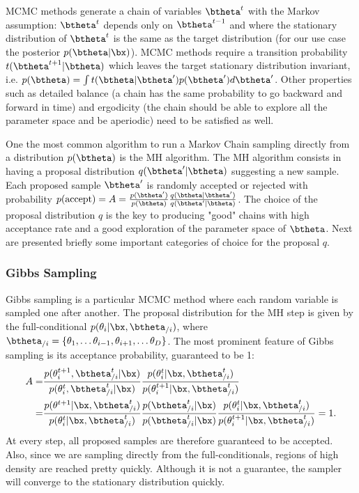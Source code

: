 \acf{MCMC} methods generate a chain of variables $\btheta^t$ with the Markov assumption: $\btheta^t$ depends only on $\btheta^{t-1}$ and where the stationary distribution of $\btheta^t$ is the same as the target distribution (for our use case the posterior $p(\btheta|\bx)$).
\ac{MCMC} methods require a transition probability $t(\btheta^{t+1}|\btheta)$ which leaves the target stationary distribution invariant, i.e. $p(\btheta) = \int t(\btheta|\btheta')p(\btheta')d\btheta'$.
Other properties such as detailed balance (a chain has the same probability to go backward and forward in time) and ergodicity (the chain should be able to explore all the parameter space and be aperiodic) need to be satisfied as well.

One the most common algorithm to run a Markov Chain sampling directly from a distribution $p(\btheta)$ is the \acf{MH} algorithm.
The \ac{MH} algorithm consists in having a proposal distribution $q(\btheta'|\btheta)$ suggesting a new sample.
Each proposed sample $\btheta'$ is randomly accepted or rejected with probability $p(\text{accept}) = A = \frac{p(\btheta')}{p(\btheta)}\frac{q(\btheta|\btheta')}{q(\btheta'|\btheta)}$.
The choice of the proposal distribution $q$ is the key to producing "good" chains with high acceptance rate and a good exploration of the parameter space of $\btheta$.
Next are presented briefly some important categories of choice for the proposal $q$.


\subsubsection{Gibbs Sampling}

Gibbs sampling is a particular \ac{MCMC} method where each random variable is sampled one after another.
The proposal distribution for the \ac{MH} step is given by the full-conditional  $p(\theta_i|\bx,\btheta_{/i})$, where $\btheta_{/i}=\{\theta_1, \ldots \theta_{i-1}, \theta_{i+1},\ldots \theta_{D}\}$.
The most prominent feature of Gibbs sampling is its acceptance probability, guaranteed to be 1:
\begin{align*}
    A =& \frac{p(\theta^{t+1}_i,\btheta^t_{/i}|\bx)}{p(\theta^t_i,\btheta^t_{/i}|\bx)}\frac{p(\theta^t_i|\bx,\btheta^{t}_{/i})}{p(\theta^{t+1}_i|\bx,\btheta^t_{/i})}\\
    =& \frac{p(\theta^{t+1}|\bx, \btheta^{t}_{/i})}{p(\theta^t_i|\bx,\btheta^t_{/i})}\frac{p(\btheta^t_{/i}|\bx)}{p(\btheta^t_{/i}|\bx)}\frac{p(\theta^t_i|\bx,\btheta^{t}_{/i})}{p(\theta^{t+1}_i|\bx,\btheta^t_{/i})} = 1.
\end{align*}
At every step, all proposed samples are therefore guaranteed to be accepted.
Also, since we are sampling directly from the full-conditionals, regions of high density are reached pretty quickly.
Although it is not a guarantee, the sampler will converge to the stationary distribution quickly.

